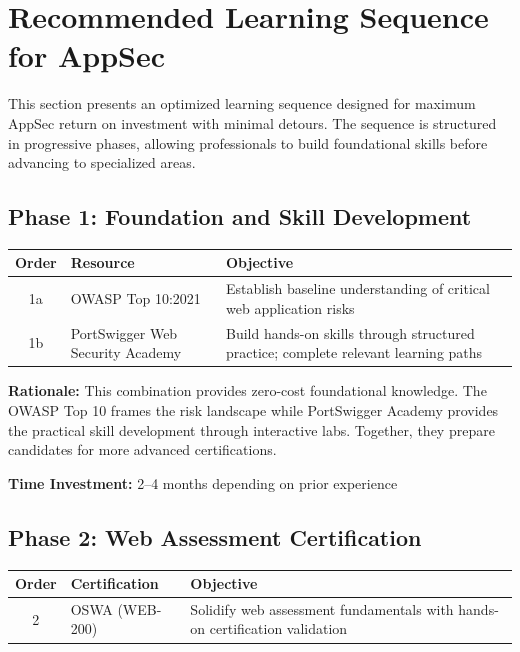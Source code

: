 \documentclass[11pt,letterpaper]{article}
\begin{document}
\section{Recommended Learning Sequence for AppSec}

This section presents an optimized learning sequence designed for maximum AppSec return on investment with minimal detours. The sequence is structured in progressive phases, allowing professionals to build foundational skills before advancing to specialized areas.

\subsection{Phase 1: Foundation and Skill Development}

\begin{table}[H]
\centering
\begin{tabularx}{\textwidth}{c l X}
\toprule
\textbf{Order} & \textbf{Resource} & \textbf{Objective} \\
\midrule
1a & OWASP Top 10:2021 & Establish baseline understanding of critical web application risks \\
\midrule
1b & PortSwigger Web Security Academy & Build hands-on skills through structured practice; complete relevant learning paths \\
\bottomrule
\end{tabularx}
\end{table}

\textbf{Rationale:} This combination provides zero-cost foundational knowledge. The OWASP Top 10 frames the risk landscape while PortSwigger Academy provides the practical skill development through interactive labs. Together, they prepare candidates for more advanced certifications.

\textbf{Time Investment:} 2--4 months depending on prior experience

\subsection{Phase 2: Web Assessment Certification}

\begin{table}[H]
\centering
\begin{tabularx}{\textwidth}{c l X}
\toprule
\textbf{Order} & \textbf{Certification} & \textbf{Objective} \\
\midrule
2 & OSWA (WEB-200) & Solidify web assessment fundamentals with hands-on certification validation \\
\bottomrule
\end{tabularx}
\end{table}
\end{document}
